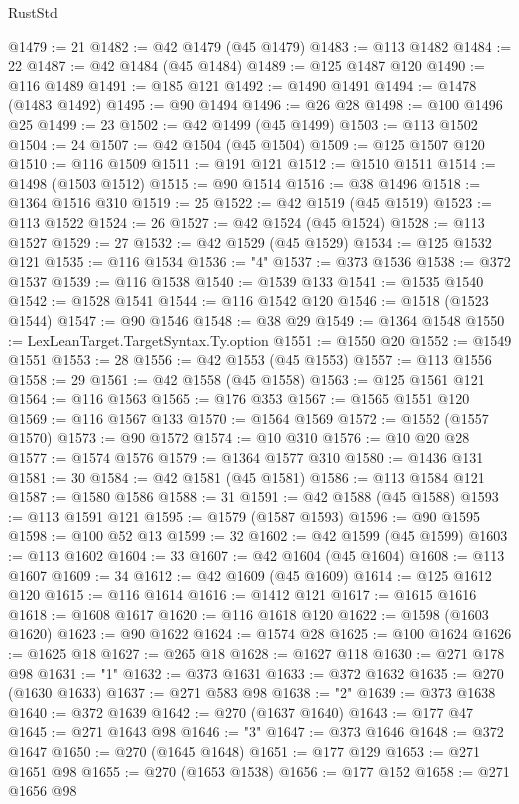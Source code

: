 \begin{lexlean}{RustStd}
\begin{coremodule}
@1479 := 21
@1482 := @42 @1479 (@45 @1479)
@1483 := @113 @1482
@1484 := 22
@1487 := @42 @1484 (@45 @1484)
@1489 := @125 @1487 @120
@1490 := @116 @1489
@1491 := @185 @121
@1492 := @1490 @1491
@1494 := @1478 (@1483 @1492)
@1495 := @90 @1494
@1496 := @26 @28
@1498 := @100 @1496 @25
@1499 := 23
@1502 := @42 @1499 (@45 @1499)
@1503 := @113 @1502
@1504 := 24
@1507 := @42 @1504 (@45 @1504)
@1509 := @125 @1507 @120
@1510 := @116 @1509
@1511 := @191 @121
@1512 := @1510 @1511
@1514 := @1498 (@1503 @1512)
@1515 := @90 @1514
@1516 := @38 @1496
@1518 := @1364 @1516 @310
@1519 := 25
@1522 := @42 @1519 (@45 @1519)
@1523 := @113 @1522
@1524 := 26
@1527 := @42 @1524 (@45 @1524)
@1528 := @113 @1527
@1529 := 27
@1532 := @42 @1529 (@45 @1529)
@1534 := @125 @1532 @121
@1535 := @116 @1534
@1536 := "4"
@1537 := @373 @1536
@1538 := @372 @1537
@1539 := @116 @1538
@1540 := @1539 @133
@1541 := @1535 @1540
@1542 := @1528 @1541
@1544 := @116 @1542 @120
@1546 := @1518 (@1523 @1544)
@1547 := @90 @1546
@1548 := @38 @29
@1549 := @1364 @1548
@1550 := LexLeanTarget.TargetSyntax.Ty.option
@1551 := @1550 @20
@1552 := @1549 @1551
@1553 := 28
@1556 := @42 @1553 (@45 @1553)
@1557 := @113 @1556
@1558 := 29
@1561 := @42 @1558 (@45 @1558)
@1563 := @125 @1561 @121
@1564 := @116 @1563
@1565 := @176 @353
@1567 := @1565 @1551 @120
@1569 := @116 @1567 @133
@1570 := @1564 @1569
@1572 := @1552 (@1557 @1570)
@1573 := @90 @1572
@1574 := @10 @310
@1576 := @10 @20 @28
@1577 := @1574 @1576
@1579 := @1364 @1577 @310
@1580 := @1436 @131
@1581 := 30
@1584 := @42 @1581 (@45 @1581)
@1586 := @113 @1584 @121
@1587 := @1580 @1586
@1588 := 31
@1591 := @42 @1588 (@45 @1588)
@1593 := @113 @1591 @121
@1595 := @1579 (@1587 @1593)
@1596 := @90 @1595
@1598 := @100 @52 @13
@1599 := 32
@1602 := @42 @1599 (@45 @1599)
@1603 := @113 @1602
@1604 := 33
@1607 := @42 @1604 (@45 @1604)
@1608 := @113 @1607
@1609 := 34
@1612 := @42 @1609 (@45 @1609)
@1614 := @125 @1612 @120
@1615 := @116 @1614
@1616 := @1412 @121
@1617 := @1615 @1616
@1618 := @1608 @1617
@1620 := @116 @1618 @120
@1622 := @1598 (@1603 @1620)
@1623 := @90 @1622
@1624 := @1574 @28
@1625 := @100 @1624
@1626 := @1625 @18
@1627 := @265 @18
@1628 := @1627 @118
@1630 := @271 @178 @98
@1631 := "1"
@1632 := @373 @1631
@1633 := @372 @1632
@1635 := @270 (@1630 @1633)
@1637 := @271 @583 @98
@1638 := "2"
@1639 := @373 @1638
@1640 := @372 @1639
@1642 := @270 (@1637 @1640)
@1643 := @177 @47
@1645 := @271 @1643 @98
@1646 := "3"
@1647 := @373 @1646
@1648 := @372 @1647
@1650 := @270 (@1645 @1648)
@1651 := @177 @129
@1653 := @271 @1651 @98
@1655 := @270 (@1653 @1538)
@1656 := @177 @152
@1658 := @271 @1656 @98

\end{coremodule}
\end{lexlean}
